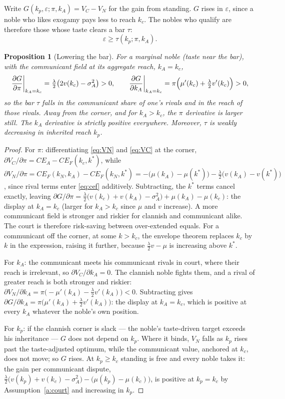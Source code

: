 \documentclass[12pt]{article}
\newtheorem{proposition}{Proposition}
\theoremstyle{definition}
\theoremstyle{remark}
\begin{document}
Write $G(k_p,\varepsilon;\pi,k_A)=V_C-V_N$ for the gain from standing. $G$ rises in $\varepsilon$, since a noble who likes exogamy pays less to reach $k_c$. The nobles who qualify are therefore those whose taste clears a bar $\tau$:
\begin{equation}\label{eq:tau}
\varepsilon \ge \tau(k_p;\pi,k_A).
\end{equation}

\begin{proposition}[Lowering the bar]\label{p:channels}
For a marginal noble (taste near the bar), with the communicant field at its aggregate reach,
$k_A=k_c$,
\[
\frac{\partial G}{\partial \pi}\bigg|_{k_A=k_c}=\tfrac{\lambda}{2}\bigl(2v(k_c)-\sigma^2_A\bigr)>0,
\qquad
\frac{\partial G}{\partial k_A}\bigg|_{k_A=k_c}=\pi\Bigl(\mu'(k_c)+\tfrac{\lambda}{2}v'(k_c)\Bigr)>0,
\]
so the bar $\tau$ falls in the communicant share of one's rivals and in the reach of those rivals. Away from the corner, and for $k_A>k_c$, the $\pi$ derivative is larger still. The $k_A$ derivative is strictly positive everywhere. Moreover, $\tau$ is weakly decreasing in inherited reach $k_p$.
\end{proposition}
\begin{proof}
For $\pi$: differentiating \eqref{eq:VN} and \eqref{eq:VC} at the corner, $\partial V_C/\partial\pi = CE_A - CE_F(k_c,k^\ast)$, while $\partial V_N/\partial\pi = CE_F(k_N,k_A)-CE_F(k_N,k^\ast) = -\bigl(\mu(k_A)-\mu(k^\ast)\bigr)-\tfrac{\lambda}{2}\bigl(v(k_A)-v(k^\ast)\bigr)$, since rival terms enter \eqref{eq:cef} additively. Subtracting, the $k^\ast$ terms cancel exactly, leaving $\partial G/\partial\pi=\tfrac{\lambda}{2}\bigl(v(k_c)+v(k_A)-\sigma^2_A\bigr)+\mu(k_A)-\mu(k_c)$: the display at $k_A=k_c$ (larger for $k_A>k_c$ since $\mu$ and $v$ increase). A more communicant field is stronger and riskier for clannish and communicant alike. The court is therefore risk-saving between over-extended equals. For a communicant off the corner, at some $k>k_c$, the envelope theorem replaces $k_c$ by $k$ in the expression, raising it further, because $\tfrac{\lambda}{2}v-\mu$ is increasing above $k^\ast$.

For $k_A$: the communicant meets his communicant rivals in court, where their reach is irrelevant, so $\partial V_C/\partial k_A=0$. The clannish noble fights them, and a rival of greater reach is both stronger and riskier: $\partial V_N/\partial k_A=\pi\bigl(-\mu'(k_A)-\tfrac{\lambda}{2}v'(k_A)\bigr)<0$. Subtracting gives $\partial G/\partial k_A=\pi\bigl(\mu'(k_A)+\tfrac{\lambda}{2}v'(k_A)\bigr)$: the display at $k_A=k_c$, which is positive at every $k_A$ whatever the noble's own position.

For $k_p$: if the clannish corner is slack --- the noble's taste-driven target exceeds his inheritance --- $G$ does not depend on $k_p$. Where it binds, $V_N$ falls as $k_p$ rises past the taste-adjusted optimum, while the communicant value, anchored at $k_c$, does not move; so $G$ rises. At $k_p\ge k_c$ standing is free and every noble takes it: the gain per communicant dispute, $\tfrac{\lambda}{2}\bigl(v(k_p)+v(k_c)-\sigma^2_A\bigr)-\bigl(\mu(k_p)-\mu(k_c)\bigr)$, is positive at $k_p=k_c$ by Assumption~\ref{a:court} and increasing in $k_p$.
\end{proof}
\end{document}
